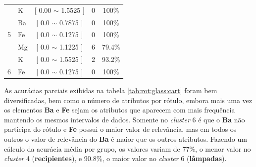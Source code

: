 \begin{table}[!ht]
{\begin{tabular}{llccc}
                                            & K     & [ 0.00 $\sim$ 1.5525 ]     &  0 & 100\% \\ 
                                            & Ba     & [ 0.0 $\sim$  0.7875 ]    &  0 & 100\% \\  
\multirow{-4}{*}{5}                         & Fe    & [ 0.0 $\sim$  0.1275 ]     &  0 & 100\% \\  \hline
                                            & Mg    & [ 0.0 $\sim$  1.1225 ]     &  6  & 79.4\% \\ 
                                            & K     & [ 0.0 $\sim$ 1.5525 ]      &  2  & 93.2\% \\ 
\multirow{-3}{*}{6}                         & Fe    & [ 0.0 $\sim$  0.1275 ]     &  0  & 100\% \\  \hline

\end{tabular}
}
\end{table}


As acurácias parciais exibidas na tabela \ref{tab:rot:glass:cart} foram bem diversificadas, bem como o número de atributos por rótulo, embora mais uma vez os elementos \textbf{Ba} e \textbf{Fe} sejam os atributos que aparecem com mais frequência mantendo os mesmos intervalos de dados. Somente no \textit{cluster} 6 é que o \textbf{Ba} não participa do rótulo e \textbf{Fe} possui o maior valor de relevância, mas em todos os outros o valor de relevância do \textbf{Ba} é maior que os outros atributos. Fazendo um cálculo da acurácia média por grupo, os valores variam de 77\%, o menor valor no \textit{cluster} 4 (\textbf{recipientes}), e 90.8\%, o maior valor no \textit{cluster} 6 (\textbf{lâmpadas}).




